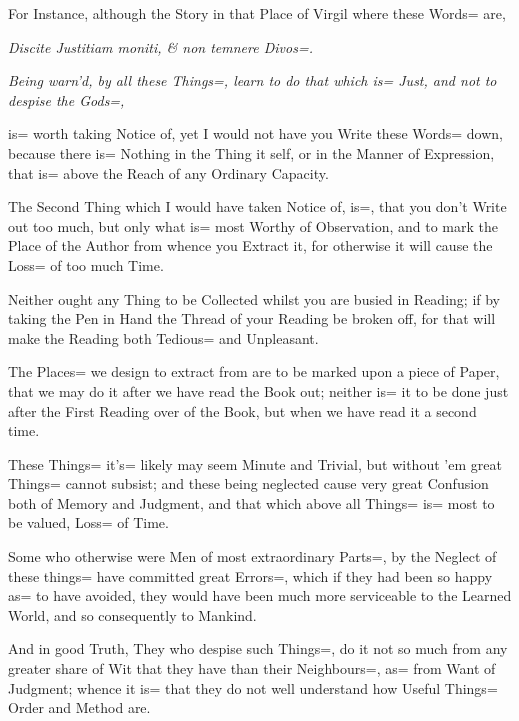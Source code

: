 {For Instance, although the Story in that Place of Virgil where these Words= are,

\emph{Discite Justitiam moniti, \& non temnere Divos=.}

\emph{Being warn'd, \emph{by all these Things=},
learn to do that which is= Just, and
not to despise the Gods=,}

is= worth taking Notice of,
yet I would not have you Write these Words= down,
because there is= Nothing in the Thing it self,
or in the Manner of Expression,
that is= above the Reach of any Ordinary Capacity.

The Second Thing which I would have taken Notice of, is=,
that you don't Write out too much,
but only what is= most Worthy of Observation,
and to mark the Place of the Author from whence you Extract it,
for otherwise it will cause the Loss= of too much Time.

Neither ought any Thing to be Collected whilst you are busied in Reading;
if by taking the Pen in Hand the Thread of your Reading be broken off,
for that will make the Reading both Tedious= and Unpleasant.

The Places= we design to extract from are to be marked upon a piece of Paper,
that we may do it after we have read the Book out;
neither is= it to be done just after the First Reading over of the Book,
but when we have read it a second time.

These Things= it's= likely may seem Minute and Trivial,
but without 'em great Things= cannot subsist;
and these being neglected cause very great Confusion both of Memory and Judgment,
and that which above all Things= is= most to be valued,
Loss= of Time.

Some who otherwise were Men of most extraordinary Parts=,
by the Neglect of these things= have committed great Errors=,
which if they had been so happy as= to have avoided,
they would have been much more serviceable to the Learned World,
and so consequently to Mankind.

And in good Truth,
They who despise such Things=,
do it not so much from any greater share of Wit that they have than their Neighbours=,
as= from Want of Judgment;
whence it is= that they do not well understand how Useful Things= Order and Method are.
}
